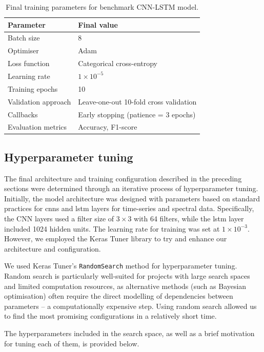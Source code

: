 \begin{table}[htb]
\centering
\begin{tabular}{ll}
\toprule
\textbf{Parameter} & \textbf{Final value} \\ \midrule
Batch size & 8 \\
Optimiser & Adam \\
Loss function & Categorical cross-entropy \\
Learning rate & $1 \times 10^{-5}$ \\
Training epochs & 10 \\
Validation approach & Leave-one-out 10-fold cross validation \\
Callbacks & Early stopping (patience = 3 epochs) \\
Evaluation metrics & Accuracy, F1-score \\ \bottomrule
\end{tabular}
\caption{Final training parameters for benchmark CNN-LSTM model.}
\label{tab:cnn-lstm-final-params}
\end{table}

\subsection{Hyperparameter tuning}

The final architecture and training configuration described in the preceding sections were determined through an iterative process of hyperparameter tuning. Initially, the model architecture was designed with parameters based on standard practices for \acrshort{cnn}s and \acrshort{lstm} layers for time-series and spectral data. Specifically, the CNN layers used a filter size of $3 \times 3$ with 64 filters, while the \acrshort{lstm} layer included 1024 hidden units. The learning rate for training was set at $1 \times 10^{-3}$. However, we employed the Keras Tuner library to try and enhance our architecture and configuration. 

We used Keras Tuner's \texttt{RandomSearch} method for hyperparameter tuning. Random search is particularly well-suited for projects with large search spaces and limited computation resources, as alternative methods (such as Bayesian optimisation) often require the direct modelling of dependencies between parameters -- a computationally expensive step. Using random search allowed us to find the most promising configurations in a relatively short time.

The hyperparameters included in the search space, as well as a brief motivation for tuning each of them, is provided below. 

